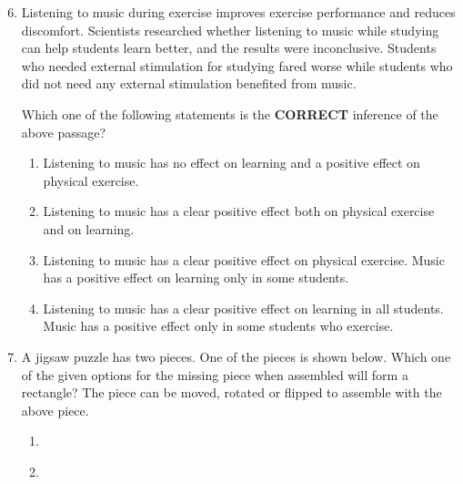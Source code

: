 \documentclass[journal,12pt,onecolumn]{IEEEtran}
\theoremstyle{remark}
\begin{document}
\begin{enumerate}
    \setcounter{enumi}{5}
    \item Listening to music during exercise improves exercise performance and reduces discomfort. Scientists researched whether listening to music while studying can help students learn better, and the results were inconclusive. Students who needed external stimulation for studying fared worse while students who did not need any external stimulation benefited from music.
    
    Which one of the following statements is the \textbf{CORRECT} inference of the above passage?
    \begin{enumerate}
        \item Listening to music has no effect on learning and a positive effect on physical exercise.
        \item Listening to music has a clear positive effect both on physical exercise and on learning.
        \item Listening to music has a clear positive effect on physical exercise. Music has a positive effect on learning only in some students.
        \item Listening to music has a clear positive effect on learning in all students. Music has a positive effect only in some students who exercise.
    \end{enumerate}

    \item A jigsaw puzzle has two pieces. One of the pieces is shown below. Which one of the given options for the missing piece when assembled will form a rectangle? The piece can be moved, rotated or flipped to assemble with the above piece.
     \begin{figure}[H]
        \centering
    \end{figure}
       
   
    \begin{enumerate}
        \item  \begin{figure}[H]
        \centering
    \end{figure}
       
        \item  \begin{figure}[H]
        \centering
    \end{figure}
       

\end{enumerate}
\end{enumerate}
\end{document}
